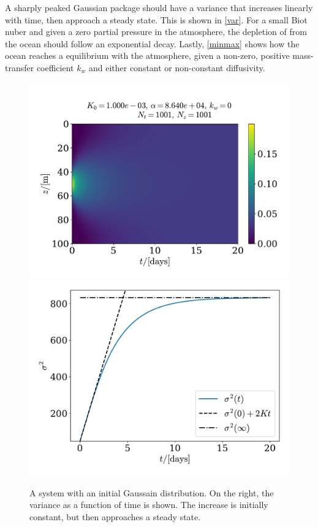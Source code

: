 \documentclass{article}
\begin{document}
    
    A sharply peaked Gaussian package should have a variance that increases linearly with time, then approach a steady state. This is shown in \autoref{var}. For a small Biot nuber and given a zero partial pressure in the atmosphere, the depletion of  from the ocean should follow an exponential decay. Lastly, \autoref{minmax} shows how the ocean reaches a equilibrium with the atmosphere, given a non-zero, positive mass-transfer coefficient $k_w$ and either constant or non-constant diffusivity.

    \begin{figure}[H]
        \centering
        \includegraphics[width=.49\textwidth]{../plots/test3}
        \includegraphics[width=.45\textwidth]{../plots/test3_var}
        \caption{A system with an initial Gaussain distribution. On the right, the variance as a function of time is shown. The increase is initially constant, but then approaches a steady state.}
        \label{var}
    \end{figure}
\end{document}
